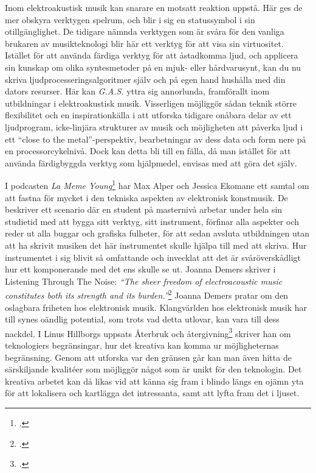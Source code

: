 \documentclass{article}
\begin{document}


Inom elektroakustisk musik kan snarare en motsatt reaktion uppstå. Här ges de mer obskyra verktygen spelrum,
och blir i sig en statussymbol i sin otillgänglighet. De tidigare nämnda verktygen som är svåra för den
vanliga brukaren av musikteknologi blir här ett verktyg för att visa sin virtuositet. Istället för att använda
färdiga verktyg för att åstadkomma ljud, och applicera sin kunskap om olika syntesmetoder på en mjuk- eller
hårdvarusynt, kan du nu skriva ljudprocesseringsalgoritmer själv och på egen hand hushålla med din dators
resurser. Här kan \emph{G.A.S.} yttra sig annorlunda, framförallt inom utbildningar i elektroakustisk
musik. Visserligen möjliggör sådan teknik större flexibilitet och en inspirationkälla i att utforska tidigare
onåbara delar av ett ljudprogram, icke-linjära strukturer av musik och möjligheten att påverka ljud i ett
``close to the metal''-perspektiv, bearbetningar av dess data och form nere på en processorcykelnivå. Dock kan
detta bli till en fälla, då man istället för att använda färdigbyggda verktyg som hjälpmedel, envisas med att
göra det själv.

I podcasten \emph{La Meme Young}\footcite{LaMemeYoung} har Max Alper och Jessica Ekomane ett samtal
om att fastna för mycket i den tekniska aspekten av elektronisk konstmusik. De beskriver ett scenario där en
student på masternivå arbetar under hela sin studietid med att bygga sitt verktyg, sitt instrument, förfinar
alla aspekter och reder ut alla buggar och grafiska fulheter, för att sedan avsluta utbildningen utan att ha
skrivit musiken det här instrumentet skulle hjälpa till med att skriva. Hur instrumentet i sig blivit så
omfattande och invecklat att det är svåröverskådligt hur ett komponerande med det ens skulle se ut. Joanna Demers
skriver i Listening Through The Noise: \emph{``The sheer freedom of electroacoustic music constitutes both
its strength and its burden.''}\footcite{JoannaDemers} Joanna Demers pratar om den oslagbara friheten hos
elektronisk musik. Klangvärlden hos elektronisk musik har till synes oändlig potential, som trots vad detta
utlovar, kan vara till dess nackdel. I Linus Hillborgs uppsats Återbruk och
återgivning\footcite{LinusHillborg} skriver han om teknologiers begränsingar, hur det kreativa kan komma ur
möjligheternas begränsning. Genom att utforska var den gränsen går kan man även hitta de särskiljande
kvalitéer som möjliggör något som är unikt för den teknologin. Det kreativa arbetet kan då likas vid att känna
sig fram i blindo längs en ojämn yta för att lokalisera och kartlägga det intressanta, samt att lyfta fram det
i ljuset.
\end{document}
